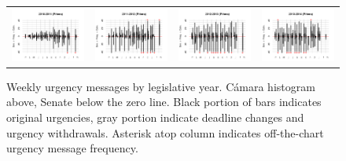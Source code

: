 \documentclass[letter,12pt]{article}
\begin{document}
\begin{figure}
\begin{center}
\begin{tabular}{cccc}
    \includegraphics[width=.22\columnwidth]{../graphs/urgenciasHistog2010.pdf} &
    \includegraphics[width=.22\columnwidth]{../graphs/urgenciasHistog2011.pdf} &
    \includegraphics[width=.22\columnwidth]{../graphs/urgenciasHistog2012.pdf} &
    \includegraphics[width=.22\columnwidth]{../graphs/urgenciasHistog2013.pdf} \\
\end{tabular}
  \caption{Weekly urgency messages by legislative year. C\'amara histogram above, Senate below the zero line. Black portion of bars indicates original urgencies, gray portion indicate deadline changes and urgency withdrawals. Asterisk atop column indicates off-the-chart urgency message frequency.}\label{f:depvarHistog}
\end{center}
\end{figure}

\end{document}
